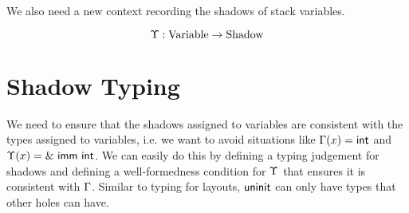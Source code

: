 We also need a new context recording the shadows of stack variables.

$$ \Upsilon : \textrm{Variable} \to \textrm{Shadow} $$



\section*{Shadow Typing}
We need to ensure that the shadows assigned to variables are consistent with the types
assigned to variables, i.e. we want to avoid situations like
$\Gamma(x)=\mathsf{int}$ and $\Upsilon(x)=\&~{{\mathsf{imm}}~{\mathsf{int}}}$.
We can easily do this by defining a typing judgement for shadows and
defining a well-formedness condition for $\Upsilon$ that ensures it is consistent with $\Gamma$.
Similar to typing for layouts, $\mathsf{uninit}$ can only have types that other holes can have.
\newline

\fbox{$\tc{}{\gs}{\gt}$}


